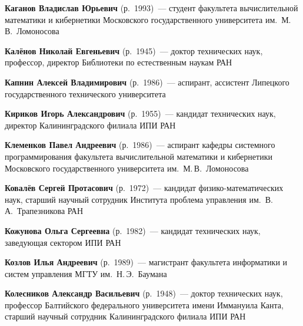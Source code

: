\begin{multicols}{2}
\vspace*{4pt}

\noindent
\textbf{Каганов Владислав Юрьевич}  (р.\ 1993)~--- студент факультета вычислительной 
математики и кибернетики Московского государственного университета им.\ М.\,В.~Ломоносова

\vspace*{4pt}

\noindent
\textbf{Калёнов Николай Евгеньевич} (р.\ 1945)~--- доктор технических наук, профессор, 
директор Библиотеки по естественным наукам РАН 

\vspace*{4pt}

\noindent
\textbf{Капнин Алексей Владимирович} (р.\ 1986)~--- аспирант, ассистент Липецкого 
государственного технического университета

\vspace*{4pt}

\noindent
\textbf{Кириков Игорь Александрович} (р.\ 1955)~--- кандидат технических наук, директор 
Калининградского филиала ИПИ РАН

\vspace*{4pt}

\noindent
\textbf{Клеменков Павел Андреевич} (р.\ 1986)~--- аспирант кафедры системного 
программирования факультета вычислительной математики и кибернетики Московского 
государственного университета им.\ М.\,В.~Ломоносова

\columnbreak

\noindent
\textbf{Ковалёв Сергей Протасович} (р.\ 1972)~--- кандидат фи\-зи\-ко-ма\-те\-ма\-ти\-че\-ских наук, 
старший научный сотрудник Института проблема управления им.\ В.\,А.~Трапезникова 
РАН

\vspace*{4pt}

\noindent
\textbf{Кожунова Ольга Сергеевна} (р.\ 1982)~--- кандидат технических наук, заведующая 
сектором ИПИ РАН

\vspace*{4pt}

\noindent \textbf{Козлов Илья Андреевич} (р.\ 1989)~--- магистрант факультета 
информатики и сис\-тем управ\-ле\-ния МГТУ им.\ Н.\,Э.~Баумана 

\vspace*{4pt}

\noindent
\textbf{Колесников Александр Васильевич} (р.\ 1948)~--- доктор технических наук, профессор 
Балтийского федерального университета имени Иммануила Канта, старший научный 
сотрудник Калининградского филиала ИПИ РАН


\end{multicols}
